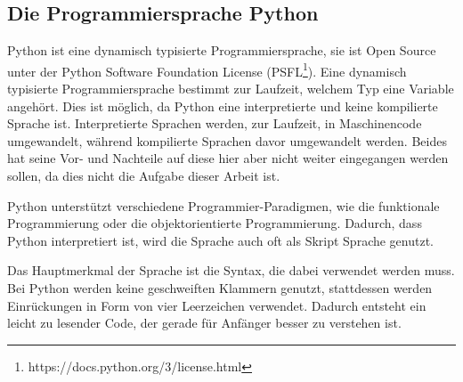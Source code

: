 \subsection{Die Programmiersprache Python}\label{einleitung:python}

Python ist eine dynamisch typisierte Programmiersprache, sie ist Open Source
unter der Python Software Foundation License
(PSFL\footnote{https://docs.python.org/3/license.html}). Eine dynamisch
typisierte Programmiersprache bestimmt zur Laufzeit, welchem Typ eine Variable
angehört. Dies ist möglich, da Python eine interpretierte und keine kompilierte
Sprache ist. Interpretierte Sprachen werden, zur Laufzeit, in Maschinencode
umgewandelt, während kompilierte Sprachen davor umgewandelt werden. Beides hat
seine Vor- und Nachteile auf diese hier aber nicht weiter eingegangen werden
sollen, da dies nicht die Aufgabe dieser Arbeit ist.

Python unterstützt verschiedene Programmier-Paradigmen, wie die funktionale
Programmierung oder die objektorientierte Programmierung. Dadurch, dass Python
interpretiert ist, wird die Sprache auch oft als Skript Sprache genutzt.

Das Hauptmerkmal der Sprache ist die Syntax, die dabei verwendet werden muss.
Bei Python werden keine geschweiften Klammern genutzt, stattdessen werden
Einrückungen in Form von vier Leerzeichen verwendet. Dadurch entsteht ein
leicht zu lesender Code, der gerade für Anfänger besser zu verstehen ist.